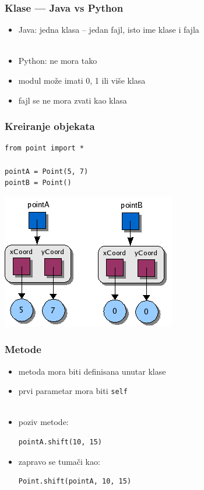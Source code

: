 \documentclass[compress]{beamer}
\begin{document}
\begin{frame}[fragile]
  \frametitle{Klase --- Java vs Python}
  \begin{itemize}
    \item Java: jedna klasa -- jedan fajl, isto ime klase i fajla \\ \ \\
    \item Python: ne mora tako
    \item modul može imati 0, 1 ili više klasa
    \item fajl se ne mora zvati kao klasa
  \end{itemize}
\end{frame}

\begin{frame}[fragile]
\frametitle{Kreiranje objekata}
\begin{verbatim}
from point import *

pointA = Point(5, 7)
pointB = Point()
\end{verbatim}
\begin{center}
  \includegraphics[scale=0.7]{ptobjects.png}
\end{center}
\end{frame}

\begin{frame}[fragile]
\frametitle{Metode}
\begin{itemize}
  \item metoda mora biti definisana unutar klase
  \item prvi parametar mora biti \texttt{self} \\ \ \\
  \item poziv metode:
\begin{verbatim}
pointA.shift(10, 15)
\end{verbatim}
  \item zapravo se tumači kao:
\begin{verbatim}
Point.shift(pointA, 10, 15)
\end{verbatim}
\end{itemize}
\end{frame}
\end{document}
